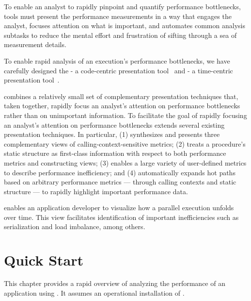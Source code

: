 \documentclass[11pt,letterpaper]{report}
\begin{document}
To enable an analyst to rapidly pinpoint and quantify performance bottlenecks, tools must present the performance measurements in a way that engages the analyst, focuses attention on what is important, and automates common analysis subtasks to reduce the mental effort and frustration of sifting through a sea of measurement details.

To enable rapid analysis of an execution's performance bottlenecks, we have carefully designed the \hpcviewer{} - a code-centric presentation tool~\cite{Adhianto-MC-Ta:2010:PSTI-hpcviewer} and \hpctraceviewer{} - a time-centric presentation tool~\cite{Tallent-MC-etal:2011:ICS-hpctoolkit-scalable-tracing}.

\hpcviewer{} combines a relatively small set of complementary presentation techniques that, taken together, rapidly focus an analyst's attention on performance bottlenecks rather than on unimportant information.
To facilitate the goal of rapidly focusing an analyst's attention on performance bottlenecks \hpcviewer{} extends several existing presentation techniques.
In particular, \hpcviewer{} (1) synthesizes and presents three complementary views of calling-context-sensitive metrics; (2) treats a procedure's static structure as first-class information with respect to both performance metrics and constructing views; (3) enables a large variety of user-defined metrics to describe performance inefficiency; and (4) automatically expands hot paths based on arbitrary performance metrics --- through calling contexts and static structure --- to rapidly highlight important performance data.

\hpctraceviewer{}  enables an application developer to visualize how a parallel execution unfolds over time. This view facilitates identification of important inefficiencies such as serialization and load imbalance, among others.




\chapter{Quick Start}
\label{chpt:quickstart}

This chapter provides a rapid overview of analyzing the performance of an application using \HPCToolkit{}.
It assumes an operational installation of \HPCToolkit{}.
\end{document}
